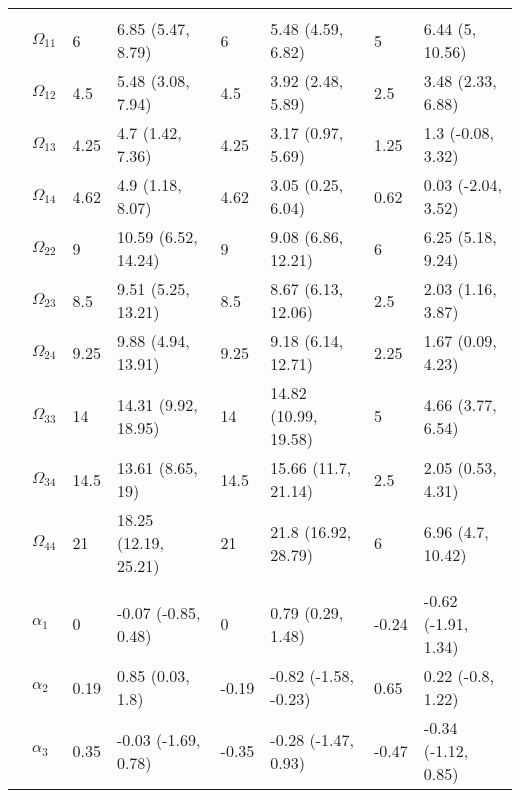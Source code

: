 \documentclass[]{article}
\begin{document}
\begin{table}[t]
\begin{tabular}{llllllll}
\addlinespace[0.3em]
\multicolumn{8}{l}{\textbf{ }}\\
\hspace{1em} & $\Omega_{11}$ & 6 & 6.85 (5.47, 8.79) & 6 & 5.48 (4.59, 6.82) & 5 & 6.44 (5, 10.56)\\
\hspace{1em} & $\Omega_{12}$ & 4.5 & 5.48 (3.08, 7.94) & 4.5 & 3.92 (2.48, 5.89) & 2.5 & 3.48 (2.33, 6.88)\\
\hspace{1em} & $\Omega_{13}$ & 4.25 & 4.7 (1.42, 7.36) & 4.25 & 3.17 (0.97, 5.69) & 1.25 & 1.3 (-0.08, 3.32)\\
\hspace{1em} & $\Omega_{14}$ & 4.62 & 4.9 (1.18, 8.07) & 4.62 & 3.05 (0.25, 6.04) & 0.62 & 0.03 (-2.04, 3.52)\\
\hspace{1em} & $\Omega_{22}$ & 9 & 10.59 (6.52, 14.24) & 9 & 9.08 (6.86, 12.21) & 6 & 6.25 (5.18, 9.24)\\
\hspace{1em} & $\Omega_{23}$ & 8.5 & 9.51 (5.25, 13.21) & 8.5 & 8.67 (6.13, 12.06) & 2.5 & 2.03 (1.16, 3.87)\\
\hspace{1em} & $\Omega_{24}$ & 9.25 & 9.88 (4.94, 13.91) & 9.25 & 9.18 (6.14, 12.71) & 2.25 & 1.67 (0.09, 4.23)\\
\hspace{1em} & $\Omega_{33}$ & 14 & 14.31 (9.92, 18.95) & 14 & 14.82 (10.99, 19.58) & 5 & 4.66 (3.77, 6.54)\\
\hspace{1em} & $\Omega_{34}$ & 14.5 & 13.61 (8.65, 19) & 14.5 & 15.66 (11.7, 21.14) & 2.5 & 2.05 (0.53, 4.31)\\
\hspace{1em} & $\Omega_{44}$ & 21 & 18.25 (12.19, 25.21) & 21 & 21.8 (16.92, 28.79) & 6 & 6.96 (4.7, 10.42)\\
\addlinespace[0.3em]
\multicolumn{8}{l}{\textbf{ }}\\
\hspace{1em} & $\alpha_{1}$ & 0 & -0.07 (-0.85, 0.48) & 0 & 0.79 (0.29, 1.48) & -0.24 & -0.62 (-1.91, 1.34)\\
\hspace{1em} & $\alpha_{2}$ & 0.19 & 0.85 (0.03, 1.8) & -0.19 & -0.82 (-1.58, -0.23) & 0.65 & 0.22 (-0.8, 1.22)\\
\hspace{1em} & $\alpha_{3}$ & 0.35 & -0.03 (-1.69, 0.78) & -0.35 & -0.28 (-1.47, 0.93) & -0.47 & -0.34 (-1.12, 0.85)\\

\end{tabular}
\end{table}
\end{document}
